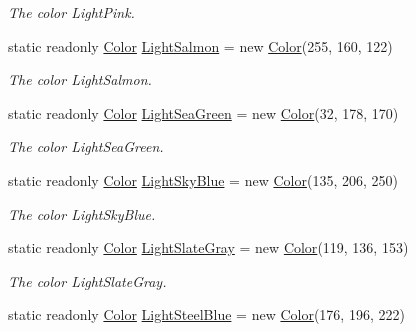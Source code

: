 \begin{DoxyCompactItemize}
\begin{DoxyCompactList}\small\item\em The color Light\-Pink. \end{DoxyCompactList}\item 
static readonly \hyperlink{struct_tri_devs_1_1_tri_engine2_d_1_1_color}{Color} \hyperlink{struct_tri_devs_1_1_tri_engine2_d_1_1_color_ad0ae2ed966eca1692513bfaa652f1ab3}{Light\-Salmon} = new \hyperlink{struct_tri_devs_1_1_tri_engine2_d_1_1_color}{Color}(255, 160, 122)
\begin{DoxyCompactList}\small\item\em The color Light\-Salmon. \end{DoxyCompactList}\item 
static readonly \hyperlink{struct_tri_devs_1_1_tri_engine2_d_1_1_color}{Color} \hyperlink{struct_tri_devs_1_1_tri_engine2_d_1_1_color_a12637153d2dbb90d48b7311dfcd390db}{Light\-Sea\-Green} = new \hyperlink{struct_tri_devs_1_1_tri_engine2_d_1_1_color}{Color}(32, 178, 170)
\begin{DoxyCompactList}\small\item\em The color Light\-Sea\-Green. \end{DoxyCompactList}\item 
static readonly \hyperlink{struct_tri_devs_1_1_tri_engine2_d_1_1_color}{Color} \hyperlink{struct_tri_devs_1_1_tri_engine2_d_1_1_color_ad4f09c59ea160e02cb67e7a092467f0f}{Light\-Sky\-Blue} = new \hyperlink{struct_tri_devs_1_1_tri_engine2_d_1_1_color}{Color}(135, 206, 250)
\begin{DoxyCompactList}\small\item\em The color Light\-Sky\-Blue. \end{DoxyCompactList}\item 
static readonly \hyperlink{struct_tri_devs_1_1_tri_engine2_d_1_1_color}{Color} \hyperlink{struct_tri_devs_1_1_tri_engine2_d_1_1_color_a9bdbe432499bebb309598b5f5d3178dd}{Light\-Slate\-Gray} = new \hyperlink{struct_tri_devs_1_1_tri_engine2_d_1_1_color}{Color}(119, 136, 153)
\begin{DoxyCompactList}\small\item\em The color Light\-Slate\-Gray. \end{DoxyCompactList}\item 
static readonly \hyperlink{struct_tri_devs_1_1_tri_engine2_d_1_1_color}{Color} \hyperlink{struct_tri_devs_1_1_tri_engine2_d_1_1_color_ad02c7b44ea5fe96eb0695ee16d9aa07a}{Light\-Steel\-Blue} = new \hyperlink{struct_tri_devs_1_1_tri_engine2_d_1_1_color}{Color}(176, 196, 222)

\end{DoxyCompactItemize}
